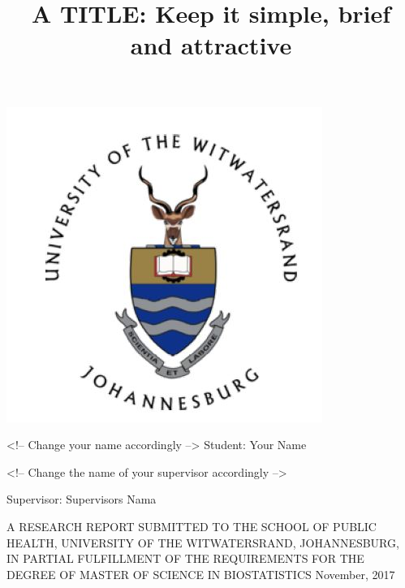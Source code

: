 \documentclass[12pt,]{article}
\title{A TITLE: Keep it simple, brief and attractive}
\author{}
\date{}
\begin{document}
\maketitle

\large
{}


\begin{centering}


\vspace{1 cm}

\includegraphics{images/university.jpg}

\vspace{1 cm}

\Large
<!-- Change your name accordingly -->
Student: Your Name 

<!-- Change the name of your supervisor accordingly -->

Supervisor: Supervisors Nama
\vspace{0.5 cm}


\normalsize

A RESEARCH REPORT SUBMITTED TO THE SCHOOL OF PUBLIC HEALTH, UNIVERSITY OF THE WITWATERSRAND, JOHANNESBURG, IN PARTIAL FULFILLMENT OF THE REQUIREMENTS FOR THE DEGREE OF MASTER OF SCIENCE IN  BIOSTATISTICS  \newline
November, 2017 

\vspace{1 cm}


\end{centering}

\newpage
\end{document}
